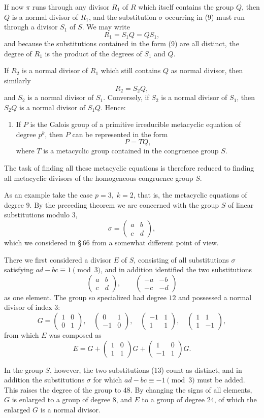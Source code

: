 \documentclass[11pt]{article}
\providecommand{\mat}[4]{\begin{pmatrix}#1&#2\\#3&#4\end{pmatrix}}
\providecommand{\mat}[4]{\begin{pmatrix}#1&#2\\#3&#4\end{pmatrix}}
\begin{document}
If now $\pi$ runs through any divisor $R_1$ of $R$ which itself contains the group $Q$, then $Q$ is a normal divisor of $R_1$, and the substitution $\sigma$ occurring in (9) must run through a divisor $S_1$ of $S$. We may write
\[
 R_1=S_1Q=QS_1,
\]
and because the substitutions contained in the form (9) are all distinct, the degree of $R_1$ is the product of the degrees of $S_1$ and $Q$.

If $R_2$ is a normal divisor of $R_1$ which still contains $Q$ as normal divisor, then similarly
\[
 R_2=S_2Q,
\]
and $S_2$ is a normal divisor of $S_1$. Conversely, if $S_2$ is a normal divisor of $S_1$, then $S_2Q$ is a normal divisor of $S_1Q$. Hence:

\begin{enumerate}[label=\Roman*.,leftmargin=2.8em,start=2]
\item If $P$ is the Galois group of a primitive irreducible metacyclic equation of degree $p^k$, then $P$ can be represented in the form
\[
 P=TQ,
\]
where $T$ is a metacyclic group contained in the congruence group $S$.
\end{enumerate}

The task of finding all these metacyclic equations is therefore reduced to finding all metacyclic divisors of the homogeneous congruence group $S$.

As an example take the case $p=3,\;k=2$, that is, the metacyclic equations of degree $9$. By the preceding theorem we are concerned with the group $S$ of linear substitutions modulo $3$,
\begin{equation}
 \sigma=\mat{a}{b}{c}{d},
 \tag{12}
\end{equation}
which we considered in \S\,66 from a somewhat different point of view.

There we first considered a divisor $E$ of $S$, consisting of all substitutions $\sigma$ satisfying $ad-bc\equiv1\pmod 3$, and in addition identified the two substitutions
\begin{equation}
 \mat{a}{b}{c}{d},\qquad
 \mat{-a}{-b}{-c}{-d}
 \tag{13}
\end{equation}
as one element. The group so specialized had degree $12$ and possessed a normal divisor of index $3$:
\[
 G=
 \mat{1}{0}{0}{1},\quad
 \mat{0}{1}{-1}{0},\quad
 \mat{-1}{1}{1}{1},\quad
 \mat{1}{1}{1}{-1},
\]
from which $E$ was composed as
\[
 E=G+\mat{1}{0}{1}{1}G+\mat{1}{0}{-1}{1}G .
\]

In the group $S$, however, the two substitutions (13) count as distinct, and in addition the substitutions $\sigma$ for which $ad-bc\equiv -1\pmod 3$ must be added. This raises the degree of the group to $48$. By changing the signs of all elements, $G$ is enlarged to a group of degree $8$, and $E$ to a group of degree $24$, of which the enlarged $G$ is a normal divisor.
\end{document}
